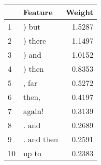 \begin{tabular}{llr}
\toprule
{} &     Feature &  Weight \\
\midrule
1  &       ) but &  1.5287 \\
2  &     ) there &  1.1497 \\
3  &       ) and &  1.0152 \\
4  &      ) then &  0.8353 \\
5  &       , far &  0.5272 \\
6  &       then, &  0.4197 \\
7  &      again! &  0.3139 \\
8  &       . and &  0.2689 \\
9  &  . and then &  0.2591 \\
10 &       up to &  0.2383 \\
\bottomrule
\end{tabular}
